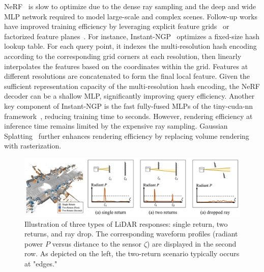NeRF~\cite{mildenhall2020nerf} is slow to optimize due to the dense ray sampling and the deep and wide MLP network required to model large-scale and complex scenes. Follow-up works have improved training efficiency by leveraging explicit feature grids~\cite{mueller2022instant,SunSC22,fridovich2022plenoxels,yu2021plenoxels} or factorized feature planes~\cite{chen2022tensorf,kplanes_2023}. For instance, Instant-NGP~\cite{mueller2022instant} optimizes a fixed-size hash lookup table. For each query point, it indexes the multi-resolution hash encoding according to the corresponding grid corners at each resolution, then linearly interpolates the features based on the coordinates within the grid. Features at different resolutions are concatenated to form the final local feature. Given the sufficient representation capacity of the multi-resolution hash encoding, the NeRF decoder can be a shallow MLP, significantly improving query efficiency. Another key component of Instant-NGP is the fast fully-fused MLPs of the tiny-cuda-nn framework~\cite{tiny-cuda-nn}, reducing training time to seconds. However, rendering efficiency at inference time remains limited by the expensive ray sampling. Gaussian Splatting~\cite{kerbl20233d} further enhances rendering efficiency by replacing volume rendering with rasterization.


\begin{figure}[t]
    \centering
    \includegraphics[width=1.0\columnwidth]{imgs/lidar_nvs.pdf}
    \caption{Illustration of three types of LiDAR responses: single return, two returns, and ray drop. The corresponding waveform profiles (radiant power $P$ versus distance to the sensor $\zeta$) are displayed in the second row. As depicted on the left, the two-return scenario typically occurs at "edges."}
    \label{fig:bg_lidar}
\end{figure}
